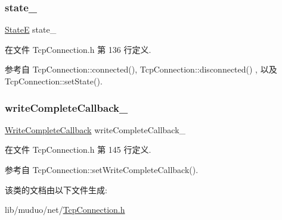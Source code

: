 \mbox{\label{classmuduo_1_1net_1_1TcpConnection_a4cfda1cf6d6cc44073a58722892cca7d}} 
\subsubsection{\texorpdfstring{state\+\_\+}{state\_}}
{\footnotesize\ttfamily \hyperlink{classmuduo_1_1net_1_1TcpConnection_a8cf72f776f4277c8138a1beaf5185325}{StateE} state\+\_\+\hspace{0.3cm}{\ttfamily [private]}}



在文件 Tcp\+Connection.\+h 第 136 行定义.



参考自 Tcp\+Connection\+::connected(), Tcp\+Connection\+::disconnected() , 以及 Tcp\+Connection\+::set\+State().

\mbox{\label{classmuduo_1_1net_1_1TcpConnection_a525f0d11cfa2e271600caa30407b6150}} 
\subsubsection{\texorpdfstring{write\+Complete\+Callback\+\_\+}{writeCompleteCallback\_}}
{\footnotesize\ttfamily \hyperlink{namespacemuduo_1_1net_a525c3730bfefb763975b035ebc88a63d}{Write\+Complete\+Callback} write\+Complete\+Callback\+\_\+\hspace{0.3cm}{\ttfamily [private]}}



在文件 Tcp\+Connection.\+h 第 145 行定义.



参考自 Tcp\+Connection\+::set\+Write\+Complete\+Callback().



该类的文档由以下文件生成\+:\begin{DoxyCompactItemize}
\item 
lib/muduo/net/\hyperlink{muduo_2net_2TcpConnection_8h}{Tcp\+Connection.\+h}\end{DoxyCompactItemize}
